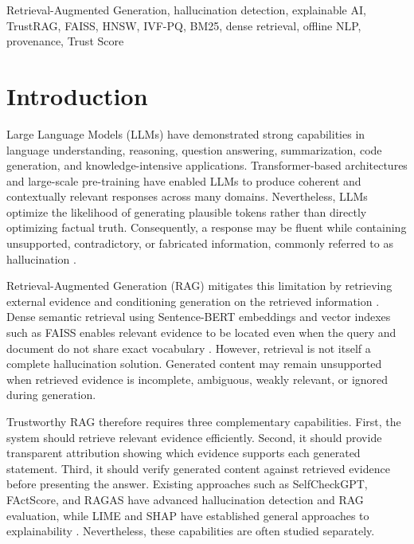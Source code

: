 \documentclass[conference]{IEEEtran}
\begin{document}
\begin{IEEEkeywords}
Retrieval-Augmented Generation, hallucination detection, explainable AI, TrustRAG, FAISS, HNSW, IVF-PQ, BM25, dense retrieval, offline NLP, provenance, Trust Score
\end{IEEEkeywords}

\section{Introduction}

Large Language Models (LLMs) have demonstrated strong capabilities in language understanding, reasoning, question answering, summarization, code generation, and knowledge-intensive applications. Transformer-based architectures and large-scale pre-training have enabled LLMs to produce coherent and contextually relevant responses across many domains. Nevertheless, LLMs optimize the likelihood of generating plausible tokens rather than directly optimizing factual truth. Consequently, a response may be fluent while containing unsupported, contradictory, or fabricated information, commonly referred to as hallucination \cite{brown2020,ji2023,huang2025}.

Retrieval-Augmented Generation (RAG) mitigates this limitation by retrieving external evidence and conditioning generation on the retrieved information \cite{lewis2020,guu2020,karpukhin2020}. Dense semantic retrieval using Sentence-BERT embeddings and vector indexes such as FAISS enables relevant evidence to be located even when the query and document do not share exact vocabulary \cite{reimers2019,johnson2021}. However, retrieval is not itself a complete hallucination solution. Generated content may remain unsupported when retrieved evidence is incomplete, ambiguous, weakly relevant, or ignored during generation.

Trustworthy RAG therefore requires three complementary capabilities. First, the system should retrieve relevant evidence efficiently. Second, it should provide transparent attribution showing which evidence supports each generated statement. Third, it should verify generated content against retrieved evidence before presenting the answer. Existing approaches such as SelfCheckGPT, FActScore, and RAGAS have advanced hallucination detection and RAG evaluation, while LIME and SHAP have established general approaches to explainability \cite{manakul2023,min2023,es2024,ribeiro2016,lundberg2017}. Nevertheless, these capabilities are often studied separately.
\end{document}
